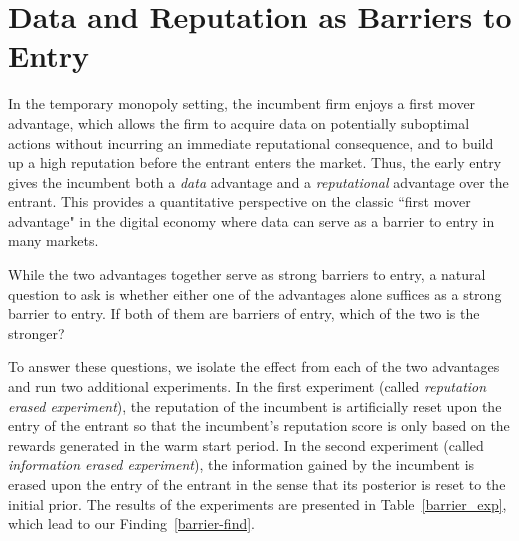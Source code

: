 \documentclass[../competing_bandits.tex]{subfiles}
\begin{document}
\section{Data and Reputation as Barriers to Entry}\label{section:6}
In the temporary monopoly setting, the incumbent firm enjoys a first
mover advantage, which allows the firm to acquire data on potentially
suboptimal actions without incurring an immediate reputational
consequence, and to build up a high reputation before the entrant
enters the market. Thus, the early entry gives the incumbent both a
\textit{data} advantage and a \textit{reputational} advantage over the
entrant. This provides a quantitative perspective on the classic
``first mover advantage" \cite{kerin1992first} in the digital economy
where data can serve as a barrier to entry in many markets.

While the two advantages together serve as strong barriers to entry, a
natural question to ask is whether either one of the advantages alone
suffices as a strong barrier to entry. If both of them are barriers of
entry, which of the two is the stronger?

To answer these questions, we isolate the effect from each of the two
advantages and run two additional experiments. In the first experiment
(called \emph{reputation erased experiment}), the reputation of the
incumbent is artificially reset upon the entry of the entrant {so that
  the incumbent's reputation score is only based on the rewards
  generated in the warm start period}. In the second experiment
(called \emph{information erased experiment}), the information gained
by the incumbent is erased upon the entry of the entrant in the sense
that its posterior is reset to the initial prior. The results of the
experiments are presented in Table~\ref{barrier_exp}, which lead to
our Finding~\ref{barrier-find}.
\end{document}
